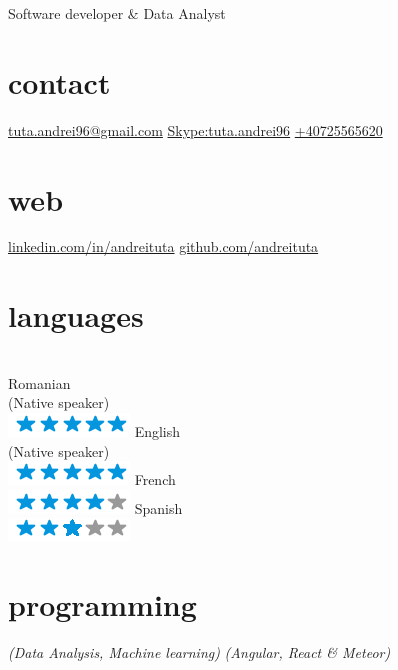 \documentclass[]{friggeri-cv}
\begin{document}
    {Software developer \& Data Analyst}


\begin{aside}
    \section{contact}
    \href{mailto:tuta.andrei96@gmail.com}{tuta.andrei96@gmail.com}
    \href{Skype : tuta.andrei96}{Skype:tuta.andrei96}
    \href{Mobile : }{ +40725565620}
    ~
    \section{web}
    \href{http://linkedin.com/in/andreituta}{linkedin.com/in/andreituta}
    \href{http://github.com/andreituta}{github.com/andreituta}
    ~ 
    
  \section{languages} 
  \\Romanian \\(Native speaker)  \\ \includegraphics[scale=0.30]{img/5stars.png}
  English \\(Native speaker) \\ \includegraphics[scale=0.30]{img/5stars.png}
  French \\ \includegraphics[scale=0.30]{img/4stars.png}
  Spanish \\ \includegraphics[scale=0.30]{img/3stars.png}
    ~
    
  \section{programming}
   \emph{(Data Analysis, Machine learning)}
    \emph{ (Angular, React \& Meteor)}
    
    ~

\end{aside}
\end{document}
